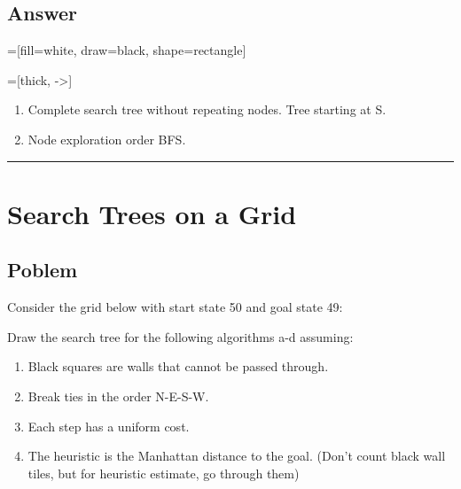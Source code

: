 \documentclass[11pt]{article}
\begin{document}
\begin{flushleft}
\subsection*{Answer}

=[fill=white, draw=black, shape=rectangle]

=[thick, ->]

\begin{enumerate}
    \item Complete search tree without repeating nodes. Tree starting at
        S.\\
        \begin{center}
        \end{center}
    \item Node exploration order BFS.
\end{enumerate}


\hspace{1cm}
\hrule
\section*{Search Trees on a Grid}

\subsection*{Poblem}
Consider the grid below with start state 50 and goal state 49:

Draw the search tree for the following algorithms a-d assuming: 
\begin{enumerate}
    \item Black squares are walls that cannot be passed through. 
    \item Break ties in the order N-E-S-W.
    \item Each step has a uniform cost.
    \item The heuristic is the Manhattan distance to the goal. (Don’t count
        black wall tiles, but for heuristic estimate, go through them)
\end{enumerate}


\end{flushleft}
\end{document}
